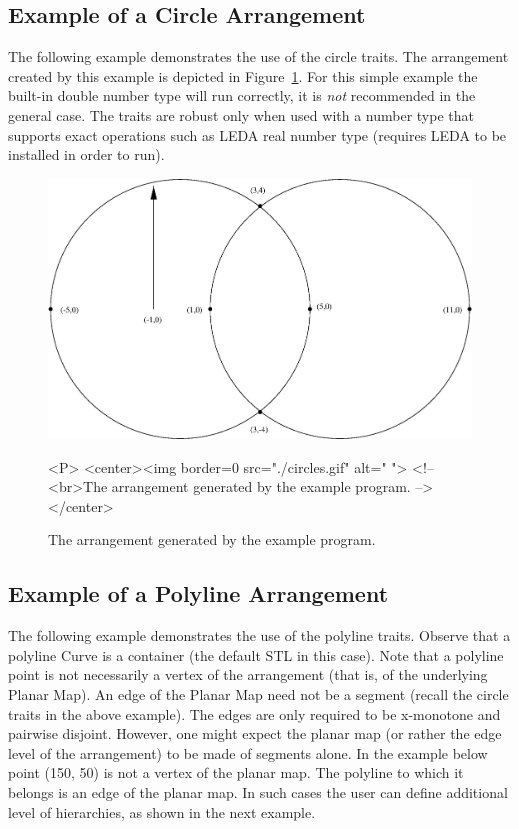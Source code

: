 \subsection{Example of a Circle Arrangement}
\label{ssec:example3}
The following example demonstrates the use of the circle traits.
The arrangement created by this example is depicted in
Figure~\ref{fig:circles}.
For this simple example the built-in double
number type will run correctly, it is {\em not} recommended
in the general case. 
The traits are robust only when used with a
number type that supports exact  operations such as LEDA real number type (requires LEDA to be installed
in order to run). 
\begin{figure}[h]
\begin{ccTexOnly}
{\centering \resizebox*{0.8\textwidth}{0.33\textheight}%
{\includegraphics{circles.eps}}}
\end{ccTexOnly}
\caption{The arrangement generated by the example program.\label{fig:circles}}
\begin{ccHtmlOnly}
<P>
<center><img border=0 src="./circles.gif" alt=" ">
<!-- <br>The arrangement generated by the example program. -->
</center>
\end{ccHtmlOnly}
\end{figure}


\subsection{Example of a Polyline Arrangement}
\label{ssec:example10}
The following example demonstrates the use of the polyline traits.
Observe that a polyline Curve is a container (the default STL in this case).
Note that a polyline point is not necessarily  a vertex of the arrangement 
(that is, of the underlying Planar Map).
An edge of the Planar Map need not be a segment (recall the circle traits 
in the above example). The edges are only required to be x-monotone and pairwise disjoint. However, one might expect the planar map (or rather the edge level of the arrangement) to be made of segments alone. 
In the example below point (150, 50) is not a vertex of the planar map. 
The polyline to which it belongs is an edge of the planar map. In such cases the user can define additional level of hierarchies, as shown in the next example.

